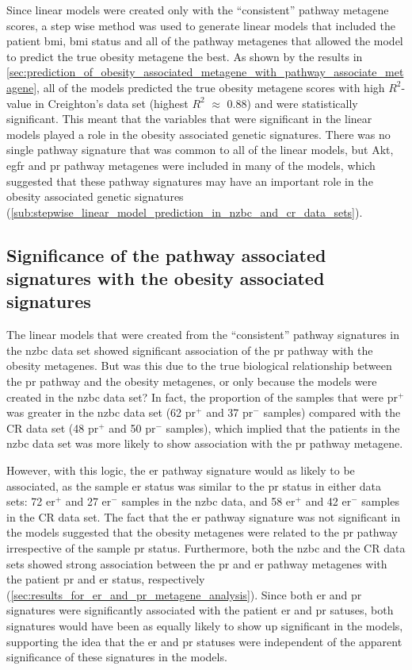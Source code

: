 Since linear models were created only with the ``consistent'' pathway metagene scores, a step wise method was used to generate linear models that included the patient \gls{bmi}, \gls{bmi} status and all of the pathway metagenes that allowed the model to predict the true obesity metagene the best.
As shown by the results in \cref{sec:prediction_of_obesity_associated_metagene_with_pathway_associate_metagene}, all of the models predicted the true obesity metagene scores with high $R^2$-value in Creighton's data set (highest $R^2$ $\approx$ 0.88) and were statistically significant.
This meant that the variables that were significant in the linear models played a role in the obesity associated genetic signatures.
There was no single pathway signature that was common to all of the linear models, but Akt, \gls{egfr} and \gls{pr} pathway metagenes were included in many of the models, which suggested that these pathway signatures may have an important role in the obesity associated genetic signatures (\cref{sub:stepwise_linear_model_prediction_in_nzbc_and_cr_data_sets}).

\subsection{Significance of the pathway associated signatures with the obesity associated signatures}
\label{sub:significance_of_pr_pathway}

The linear models that were created from the ``consistent'' pathway signatures in the \gls{nzbc} data set showed significant association of the \gls{pr} pathway with the obesity metagenes.
But was this due to the true biological relationship between the \gls{pr} pathway and the obesity metagenes, or only because the models were created in the \gls{nzbc} data set?
In fact, the proportion of the samples that were \gls{pr}$^+$ was greater in the \gls{nzbc} data set (62 \gls{pr}$^+$ and 37 \gls{pr}$^-$ samples) compared with the CR data set (48 \gls{pr}$^+$ and 50 \gls{pr}$^-$ samples), which implied that the patients in the \gls{nzbc} data set was more likely to show association with the \gls{pr} pathway metagene.

However, with this logic, the \gls{er} pathway signature would as likely to be associated, as the  sample  \gls{er} status was similar to the \gls{pr} status in either data sets: 72 \gls{er}$^+$ and 27 \gls{er}$^-$ samples in the \gls{nzbc} data, and 58 \gls{er}$^+$ and  42 \gls{er}$^-$ samples in the  CR data set.
The fact that the \gls{er} pathway signature was not significant in the models suggested that the obesity metagenes were related to the \gls{pr} pathway irrespective of the sample \gls{pr} status.
Furthermore, both the \gls{nzbc} and the CR data sets showed strong association between the \gls{pr} and \gls{er} pathway metagenes with the patient \gls{pr} and \gls{er} status, respectively (\cref{sec:results_for_er_and_pr_metagene_analysis}).
Since both \gls{er} and \gls{pr} signatures were significantly associated with the patient \gls{er} and \gls{pr} satuses, both signatures would have been as equally likely to show up significant in the models, supporting the idea that the \gls{er} and \gls{pr} statuses were independent of the apparent significance of these signatures in the models.

